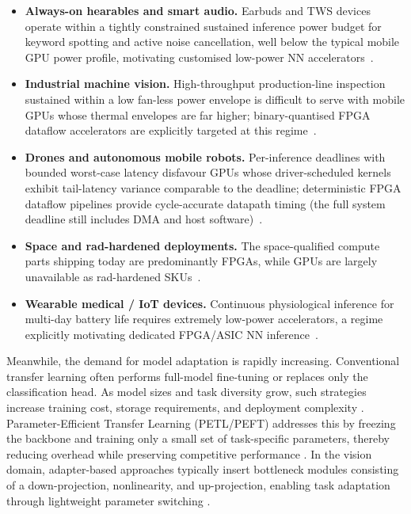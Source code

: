 \documentclass[12pt, a4paper]{report}
\numberwithin{equation}{chapter}
\numberwithin{figure}{chapter}
\numberwithin{table}{chapter}
\numberwithin{algorithm}{chapter}
\begin{document}
\begin{itemize}
    \item \textbf{Always-on hearables and smart audio.} Earbuds and TWS devices operate within a tightly constrained sustained inference power budget for keyword spotting and active noise cancellation, well below the typical mobile GPU power profile, motivating customised low-power NN accelerators~\cite{Liu2024LightweightDLSurvey}.
    \item \textbf{Industrial machine vision.} High-throughput production-line inspection sustained within a low fan-less power envelope is difficult to serve with mobile GPUs whose thermal envelopes are far higher; binary-quantised FPGA dataflow accelerators are explicitly targeted at this regime~\cite{Su2023BNNFPGASurvey, Zhan2023BNNEdge, Khaki2025OptimizingDL}.
    \item \textbf{Drones and autonomous mobile robots.} Per-inference deadlines with bounded worst-case latency disfavour GPUs whose driver-scheduled kernels exhibit tail-latency variance comparable to the deadline; deterministic FPGA dataflow pipelines provide cycle-accurate datapath timing (the full system deadline still includes DMA and host software)~\cite{Li2025DataflowTiling, Jungemann2025FINNHPC}.
    \item \textbf{Space and rad-hardened deployments.} The space-qualified compute parts shipping today are predominantly FPGAs, while GPUs are largely unavailable as rad-hardened SKUs~\cite{Antunes2025SpaceSurvey}.
    \item \textbf{Wearable medical / IoT devices.} Continuous physiological inference for multi-day battery life requires extremely low-power accelerators, a regime explicitly motivating dedicated FPGA/ASIC NN inference~\cite{Nechi2023FPGADLSurvey, Gao2025CNNFPGA, Antunes2025SpaceSurvey}.
\end{itemize}

Meanwhile, the demand for model adaptation is rapidly increasing. Conventional transfer learning often performs full-model fine-tuning or replaces only the classification head. As model sizes and task diversity grow, such strategies increase training cost, storage requirements, and deployment complexity \cite{Yu2024VisualTuning, He2016ResNet}. Parameter-Efficient Transfer Learning (PETL/PEFT) addresses this by freezing the backbone and training only a small set of task-specific parameters, thereby reducing overhead while preserving competitive performance \cite{Houlsby2019Adapters, Hu2022LoRA, Belanec2025PEFTBench}. In the vision domain, adapter-based approaches typically insert bottleneck modules consisting of a down-projection, nonlinearity, and up-projection, enabling task adaptation through lightweight parameter switching \cite{Chen2024ConvAdapter, Jie2023PrecisionRedundancy}.
\end{document}
